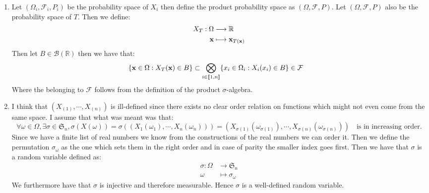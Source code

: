 \documentclass[10pt,a4paper]{article}
\begin{document}
\begin{enumerate}

\item Let $(\Omega_i, \mathcal{F}_i, P_i)$ be the probability space of $X_i$ then define the product probability space as $(\Omega, \mathcal{F}, P)$. Let $(\Omega, \mathcal{F}, P)$ also be the probability space of $T$. Then we define:
\begin{align*}
X_T : \Omega &\longrightarrow \mathbb{R}\\
\vb{x} &\longmapsto \vb{x}_{T(\vb{x})}
\end{align*}
Then let $B \in \mathcal{B}(\mathbb{R})$ then we have that:
\begin{align*}
\{\vb{x} \in \Omega : X_T(\vb{x}) \in B\} &\subset \bigotimes_{i \in \llbracket 1, n \rrbracket} \{x_i \in \Omega_i :  X_i(x_i) \in B\} \in \mathcal{F}
\end{align*}
Where the belonging to $\mathcal{F}$ follows from the definition of the product $\sigma$-algebra. 

\item I think that $(X_{(1)}, \cdots, X_{(n)})$ is ill-defined since there exists no clear order relation on functions which might not even come from the same space. I assume that what was meant was that:
\[
\forall \omega \in \Omega, \exists \sigma \in \mathfrak{S}_n, \sigma(X(\omega)) = \sigma\left(\left(X_1(\omega_1), \cdots, X_n(\omega_n)\right)\right) = (X_{\sigma(1)}(\omega_{\sigma(1)}), \cdots, X_{\sigma(n)}(\omega_{\sigma(n)})) \mbox{~~ is in increasing order.} 
\]
Since we have a finite list of real numbers we know from the constructions of the real numbers we can order it. Then we define the permutation $\sigma_\omega$ as the one which sets them in the right order and in case of parity the smaller index goes first. Then we have that $\sigma$ is a random variable defined as:
\begin{align*}
\sigma : \Omega &\longrightarrow \mathfrak{S}_n\\
\omega &\longmapsto \sigma_\omega
\end{align*}
We furthermore have that $\sigma$ is injective and therefore measurable. Hence $\sigma$ is a well-defined random variable. 


\end{enumerate}
\end{document}
